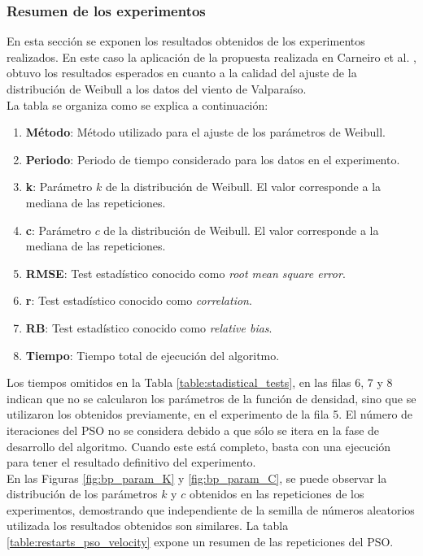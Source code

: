 \subsubsection{Resumen de los experimentos}
En esta sección se exponen los resultados obtenidos de los experimentos realizados. En este caso la aplicación de la propuesta realizada en Carneiro et al. \cite{Carneiro15}, obtuvo los resultados esperados en cuanto a la calidad del ajuste de la distribución de Weibull a los datos del viento de Valparaíso.\\
La tabla se organiza como se explica a continuación:
\begin{enumerate}
  \item \textbf{Método}: Método utilizado para el ajuste de los parámetros de Weibull.
  \item \textbf{Periodo}: Periodo de tiempo considerado para los datos en el experimento.
  \item \textbf{k}: Parámetro $k$ de la distribución de Weibull. El valor corresponde a la mediana de las repeticiones.
  \item \textbf{c}: Parámetro $c$ de la distribución de Weibull. El valor corresponde a la mediana de las repeticiones.
  \item \textbf{RMSE}: Test estadístico conocido como \emph{root mean square error}.
  \item \textbf{r}: Test estadístico conocido como \emph{correlation}.
  \item \textbf{RB}: Test estadístico conocido como \emph{relative bias}.
  \item \textbf{Tiempo}: Tiempo total de ejecución del algoritmo.
\end{enumerate}
Los tiempos omitidos en la Tabla \ref{table:stadistical_tests}, en las filas 6, 7 y 8 indican que no se calcularon los parámetros de la función de densidad, sino que se utilizaron los obtenidos previamente, en el experimento de la fila 5. El número de iteraciones del PSO no se considera debido a que sólo se itera en la fase de desarrollo del algoritmo. Cuando este está completo, basta con una ejecución para tener el resultado definitivo del experimento.\\
En las Figuras \ref{fig:bp_param_K} y \ref{fig:bp_param_C}, se puede observar la distribución de los parámetros $k$ y $c$ obtenidos en las repeticiones de los experimentos, demostrando que independiente de la semilla de números aleatorios utilizada los resultados obtenidos son similares. La tabla \ref{table:restarts_pso_velocity} expone un resumen de las repeticiones del PSO.
